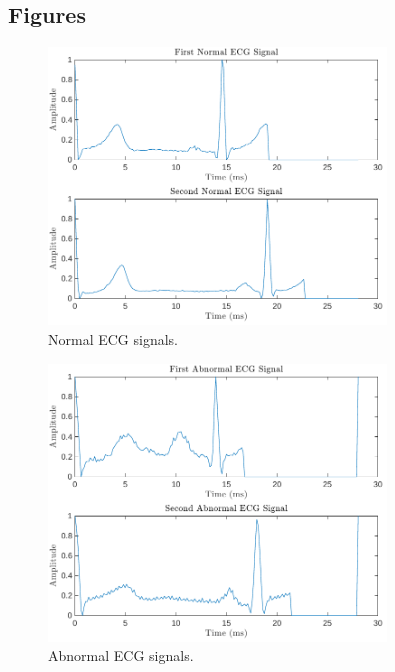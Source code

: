 \documentclass{zc-ust-hw}
\begin{document}
\subsection{Figures}

\begin{figure}[H]
  \centering
  \includegraphics[width=0.8\textwidth]{figures/Normal_ECG_Signal.pdf}
  \caption{Normal ECG signals.}
\end{figure}

\begin{figure}[H]
  \centering
  \includegraphics[width=0.8\textwidth]{figures/Abnormal_ECG_Signal.pdf}
  \caption{Abnormal ECG signals.}
\end{figure}
\end{document}
